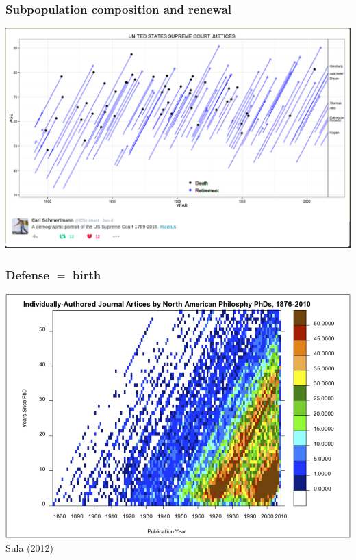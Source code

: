 \documentclass[20pt]{beamer}
\begin{document}
\begin{frame}
\frametitle{Subpopulation composition and renewal}
\includegraphics[scale=.65]{Figures/SchmertmannJustices.png}
\end{frame}

\begin{frame}
\frametitle{Defense $=$ birth}
\includegraphics[scale=1.3]{Figures/LexisArticles.png}\\
Sula (2012)
\end{frame}

%
%
%
\end{document}
